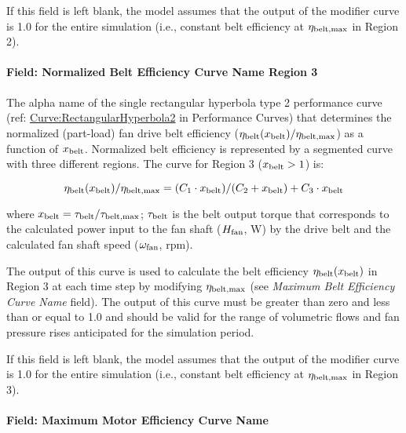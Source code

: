 If this field is left blank, the model assumes that the output of the modifier curve is 1.0 for the entire simulation (i.e., constant belt efficiency at \(\eta_{\rm{belt, max}}\) in Region 2).

\paragraph{Field: Normalized Belt Efficiency Curve Name Region 3}\label{field-normalized-belt-efficiency-curve-name-region-3}

The alpha name of the single rectangular hyperbola type 2 performance curve (ref: \hyperref[curverectangularhyperbola2]{Curve:RectangularHyperbola2} in Performance Curves) that determines the normalized (part-load) fan drive belt efficiency (\(\eta_{\rm{belt}} (x_{\rm{belt}}) / \eta_{\rm{belt, max}}\)) as a function of \(x_{\rm{belt}}\). Normalized belt efficiency is represented by a segmented curve with three different regions. The curve for Region 3 (\(x_{\rm{belt}} > 1\)) is:

\begin{equation}
  \eta_{\rm{belt}} ( x_{\rm{belt}} ) / \eta_{\rm{belt, max}} = ( C_1 \cdot x_{\rm{belt}} ) / ( C_2 + x_{\rm{belt}} ) + C_3 \cdot x_{\rm{belt}}
\end{equation}

where \(x_{\rm{belt}} = \tau_{\rm{belt}} / \tau_{\rm{belt, max}}\); \(\tau_{\rm{belt}}\) is the belt output torque that corresponds to the calculated power input to the fan shaft (\(H_{\rm{fan}}\), W) by the drive belt and the calculated fan shaft speed (\(\omega_{\rm{fan}}\), rpm).

The output of this curve is used to calculate the belt efficiency \(\eta_{\rm{belt}} (x_{\rm{belt}})\) in Region 3 at each time step by modifying \(\eta_{\rm{belt, max}}\) (see \emph{Maximum Belt Efficiency Curve Name} field). The output of this curve must be greater than zero and less than or equal to 1.0 and should be valid for the range of volumetric flows and fan pressure rises anticipated for the simulation period.

If this field is left blank, the model assumes that the output of the modifier curve is 1.0 for the entire simulation (i.e., constant belt efficiency at \(\eta_{\rm{belt, max}}\) in Region 3).

\paragraph{Field: Maximum Motor Efficiency Curve Name}\label{field-maximum-motor-efficiency-curve-name}

